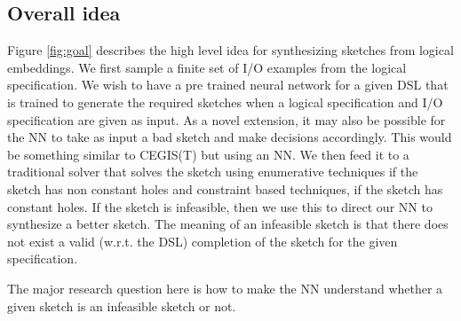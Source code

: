 \subsection{Overall idea}

Figure \ref{fig:goal} describes the high level idea for synthesizing sketches from logical embeddings. We first sample a finite set of I/O examples from the logical specification. We wish to have a pre trained neural network for a given DSL that is trained to generate the required sketches when a logical specification and I/O specification are given as input. As a novel extension, it may also be possible for the NN to take as input a bad sketch and make decisions accordingly. This would be something similar to CEGIS(T) but using an NN. We then feed it to a traditional solver that solves the sketch using enumerative techniques if the sketch has non constant holes and constraint based techniques, if the sketch has constant holes. If the sketch is infeasible, then we use this to direct our NN to synthesize a better sketch. The meaning of an infeasible sketch is that there does not exist a valid (w.r.t. the DSL) completion of the sketch for the given specification.

The major research question here is how to make the NN understand whether a given sketch is an infeasible sketch or not.